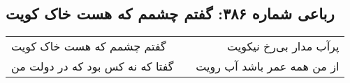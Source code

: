 \begin{center}
\section*{رباعی شماره ۳۸۶: گفتم چشمم که هست خاک کویت}
\label{sec:0386}
\begin{longtable}{l p{0.5cm} r}
گفتم چشمم که هست خاک کویت
&&
پرآب مدار بی‌رخ نیکویت
\\
گفتا که نه کس بود که در دولت من
&&
از من همه عمر باشد آب رویت
\\
\end{longtable}
\end{center}
